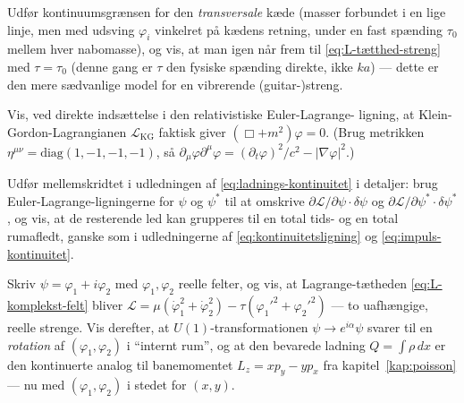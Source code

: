 \begin{opgave}
Udfør kontinuumsgrænsen for den \emph{transversale} kæde (masser
forbundet i en lige linje, men med udsving $\varphi_i$ vinkelret på
kædens retning, under en fast spænding $\tau_0$ mellem hver
nabomasse), og vis, at man igen når frem til
\eqref{eq:L-tætthed-streng} med $\tau=\tau_0$ (denne gang er $\tau$
den fysiske spænding direkte, ikke $ka$) — dette er den mere
sædvanlige model for en vibrerende (guitar-)streng.
\end{opgave}

\begin{opgave}
Vis, ved direkte indsættelse i den relativistiske Euler-Lagrange-
ligning, at Klein-Gordon-Lagrangianen $\mathcal{L}_{\text{KG}}$
faktisk giver $(\Box+m^2)\varphi=0$. (Brug metrikken
$\eta^{\mu\nu}=\text{diag}(1,-1,-1,-1)$, så
$\partial_\mu\varphi\partial^\mu\varphi = (\partial_t\varphi)^2/c^2 - |\nabla\varphi|^2$.)
\end{opgave}

\begin{opgave}
Udfør mellemskridtet i udledningen af \eqref{eq:ladnings-kontinuitet}
i detaljer: brug Euler-Lagrange-ligningerne for $\psi$ og $\psi^\ast$
til at omskrive $\partial\mathcal{L}/\partial\psi\cdot\delta\psi$ og
$\partial\mathcal{L}/\partial\psi^\ast\cdot\delta\psi^\ast$, og vis, at
de resterende led kan grupperes til en total tids- og en total
rumafledt, ganske som i udledningerne af
\eqref{eq:kontinuitetsligning} og \eqref{eq:impuls-kontinuitet}.
\end{opgave}

\begin{opgave}
Skriv $\psi=\varphi_1+i\varphi_2$ med $\varphi_1,\varphi_2$ reelle
felter, og vis, at Lagrange-tætheden \eqref{eq:L-komplekst-felt}
bliver $\mathcal{L}=\mu(\dot\varphi_1^2+\dot\varphi_2^2)-\tau(\varphi_1'^2+\varphi_2'^2)$
— to uafhængige, reelle strenge. Vis derefter, at $U(1)$-transformationen
$\psi\to e^{i\alpha}\psi$ svarer til en \emph{rotation} af
$(\varphi_1,\varphi_2)$ i ``internt rum'', og at den bevarede ladning
$Q=\int\rho\,dx$ er den kontinuerte analog til banemomentet
$L_z=xp_y-yp_x$ fra kapitel~\ref{kap:poisson} — nu med $(\varphi_1,\varphi_2)$
i stedet for $(x,y)$.
\end{opgave}
